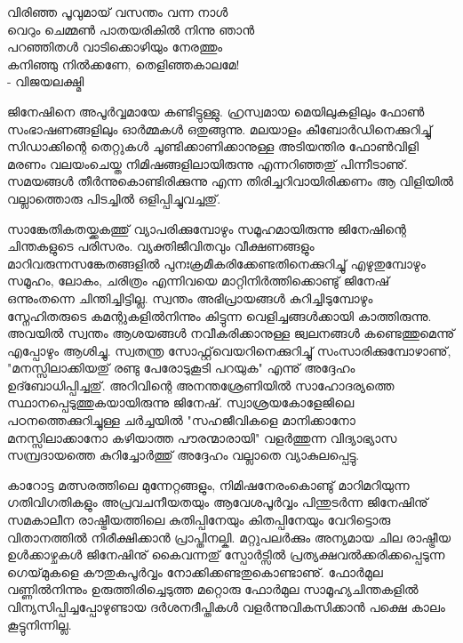 ﻿
{\vskip 2pt}

\hspace*{6em}\parbox{6cm}{
വിരിഞ്ഞ പൂവുമായ് വസന്തം വന്ന നാള്‍\\
വെറും ചെമ്മണ്‍ പാതയരികില്‍ നിന്നു ഞാന്‍\\
പറഞ്ഞിതള്‍ വാടിക്കൊഴിയും നേരത്തും\\
കനിഞ്ഞു നില്‍ക്കണേ, തെളിഞ്ഞകാലമേ!\\
\hspace*{10em} - വിജയലക്ഷ്മി
}

{\vskip 12pt}

ജിനേഷിനെ അപൂര്‍വ്വമായേ കണ്ടിട്ടുള്ളു. ഹ്രസ്വമായ മെയിലുകളിലും ഫോണ്‍ സംഭാഷണങ്ങളിലും ഓര്‍മ്മകള്‍ ഒതുങ്ങുന്നു. മലയാളം കീബോര്‍ഡിനെക്കുറിച്ചു് സിഡാക്കിന്റെ തെറ്റുകള്‍ ചൂണ്ടിക്കാണിക്കാനുള്ള അടിയന്തിര ഫോണ്‍വിളി മരണം വലയംചെയ്ത നിമിഷങ്ങളിലായിരുന്നു എന്നറിഞ്ഞതു് പിന്നീടാണു്. സമയങ്ങള്‍ തീര്‍ന്നുകൊണ്ടിരിക്കുന്നു എന്ന തിരിച്ചറിവായിരിക്കണം ആ വിളിയില്‍ വല്ലാത്തൊരു പിടച്ചില്‍ ഒളിപ്പിച്ചുവച്ചതു്.

സാങ്കേതികതയ്ക്കകത്തു് വ്യാപരിക്കുമ്പോഴും സമൂഹമായിരുന്നു ജിനേഷിന്റെ ചിന്തകളുടെ പരിസരം. വ്യക്തിജീവിതവും വീക്ഷണങ്ങളും മാറിവരുന്നസങ്കേതങ്ങളില്‍ പുനഃക്രമീകരിക്കേണ്ടതിനെക്കുറിച്ചു് എഴുതുമ്പോഴും സമൂഹം, ലോകം, ചരിത്രം എന്നിവയെ മാറ്റിനിര്‍ത്തിക്കൊണ്ടു് ജിനേഷ് ഒന്നുംതന്നെ ചിന്തിച്ചിട്ടില്ല. സ്വന്തം അഭിപ്രായങ്ങള്‍ കുറിച്ചിടുമ്പോഴും സ്നേഹിതരുടെ കമന്റുകളില്‍നിന്നും കിട്ടുന്ന വെളിച്ചങ്ങള്‍ക്കായി കാത്തിരുന്നു. അവയില്‍ സ്വന്തം ആശയങ്ങള്‍ നവീകരിക്കാനുള്ള ജ്വലനങ്ങള്‍ കണ്ടെത്തുമെന്നു് എപ്പോഴും ആശിച്ചു. സ്വതന്ത്ര സോഫ്റ്റ്‌വെയറിനെക്കുറിച്ചു് സംസാരിക്കുമ്പോഴാണു്, "മനസ്സിലാക്കിയതു് രണ്ടു പേരോടുകൂടി പറയുക" എന്നു് അദ്ദേഹം ഉദ്ബോധിപ്പിച്ചതു്. അറിവിന്റെ അനന്തശ്രേണിയില്‍ സാഹോദര്യത്തെ സ്ഥാനപ്പെടുത്തുകയായിരുന്നു ജിനേഷ്. സ്വാശ്രയകോളേജിലെ പഠനത്തെക്കുറിച്ചുള്ള ചര്‍ച്ചയില്‍ "സഹജീവികളെ മാനിക്കാനോ മനസ്സിലാക്കാനോ കഴിയാത്ത പൗരന്മാരായി" വളര്‍ത്തുന്ന വിദ്യാഭ്യാസ സമ്പ്രദായത്തെ കുറിച്ചോര്‍ത്തു് അദ്ദേഹം വല്ലാതെ വ്യാകുലപ്പെട്ടു.

കാറോട്ട മത്സരത്തിലെ മുന്നേറ്റങ്ങളും, നിമിഷനേരംകൊണ്ടു് മാറിമറിയുന്ന ഗതിവിഗതികളും അപ്രവചനീയതയും ആവേശപൂര്‍വ്വം പിന്തുടര്‍ന്ന ജിനേഷിനു് സമകാലീന രാഷ്ട്രീയത്തിലെ കുതിപ്പിനേയും കിതപ്പിനേയും വേറിട്ടൊരു വിതാനത്തില്‍ നിരീക്ഷിക്കാന്‍ പ്രാപ്തിനല്കി. മറ്റുപലര്‍ക്കും അന്യമായ ചില രാഷ്ട്രീയ ഉള്‍ക്കാഴ്ചകള്‍ ജിനേഷിനു് കൈവന്നതു് സ്പോര്‍ട്സില്‍ പ്രത്യക്ഷവല്‍ക്കരിക്കപ്പെടുന്ന ഗെയ്‌മുകളെ കൗതുകപൂര്‍വ്വം നോക്കിക്കണ്ടതുകൊണ്ടാണു്. ഫോര്‍മുല വണ്ണില്‍നിന്നും ഉരുത്തിരിച്ചെടുത്ത മറ്റൊരു ഫോര്‍മുല സാമൂഹ്യചിന്തകളില്‍ വിന്യസിപ്പിച്ചപ്പോഴുണ്ടായ ദര്‍ശനദീപ്തികള്‍ വളര്‍ന്നുവികസിക്കാന്‍ പക്ഷെ കാലം കൂട്ടുനിന്നില്ല.

